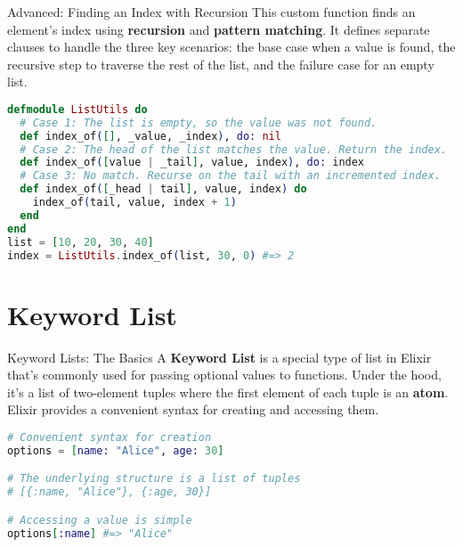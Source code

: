 \documentclass[aspectratio=169, table]{beamer}
\begin{document}
\begin{frame}[fragile]{Advanced: Finding an Index with Recursion}
\vspace{20pt}
This custom function finds an element's index using \textbf{recursion} and \textbf{pattern matching}. It defines separate clauses to handle the three key scenarios: the base case when a value is found, the recursive step to traverse the rest of the list, and the failure case for an empty list.

\begin{lstlisting}[language=Elixir, basicstyle=\ttfamily\footnotesize]
defmodule ListUtils do
  # Case 1: The list is empty, so the value was not found.
  def index_of([], _value, _index), do: nil
  # Case 2: The head of the list matches the value. Return the index.
  def index_of([value | _tail], value, index), do: index
  # Case 3: No match. Recurse on the tail with an incremented index.
  def index_of([_head | tail], value, index) do
    index_of(tail, value, index + 1)
  end
end
list = [10, 20, 30, 40]
index = ListUtils.index_of(list, 30, 0) #=> 2
\end{lstlisting}
\end{frame}

\section{Keyword List}

\begin{frame}[fragile]{Keyword Lists: The Basics}
\vspace{20pt}
A \textbf{Keyword List} is a special type of list in Elixir that's commonly used for passing optional values to functions. Under the hood, it's a list of two-element tuples where the first element of each tuple is an \textbf{atom}. Elixir provides a convenient syntax for creating and accessing them.

\begin{lstlisting}[language=Elixir]
# Convenient syntax for creation
options = [name: "Alice", age: 30]

# The underlying structure is a list of tuples
# [{:name, "Alice"}, {:age, 30}]

# Accessing a value is simple
options[:name] #=> "Alice"
\end{lstlisting}
\end{frame}
\end{document}
